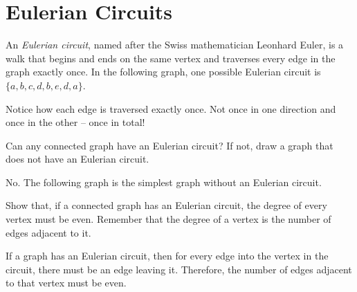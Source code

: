 \documentclass[11pt]{article}
\begin{document}
\section{Eulerian Circuits}

\begin{definition}
\label{def:eulerian-circuit}
An \textit{Eulerian circuit}, named after the Swiss mathematician Leonhard Euler, is a walk that begins and ends on the same vertex and traverses every edge in the
graph exactly once. In the following graph, one possible Eulerian circuit is $\{a, b, c, d, b, e, d, a\}$.
\begin{center}
\end{center}
Notice how each edge is traversed exactly once. Not once in one direction and once in the other -- once in total!
\end{definition}

\begin{problem} %
Can any connected graph have an Eulerian circuit? If not, draw a graph that does not have an Eulerian circuit.
\end{problem}

\begin{solution}
No. The following graph is the simplest graph without an Eulerian circuit.
\begin{center}
\end{center}
\end{solution}

\begin{problem} %
Show that, if a connected graph has an Eulerian circuit, the degree of every vertex must be even. Remember that the degree of a vertex is the number of edges
adjacent to it.
\end{problem}

\begin{solution}
If a graph has an Eulerian circuit, then for every edge into the vertex in the circuit, there must be an edge leaving it. Therefore, the number of edges adjacent
to that vertex must be even.
\end{solution}
\end{document}
